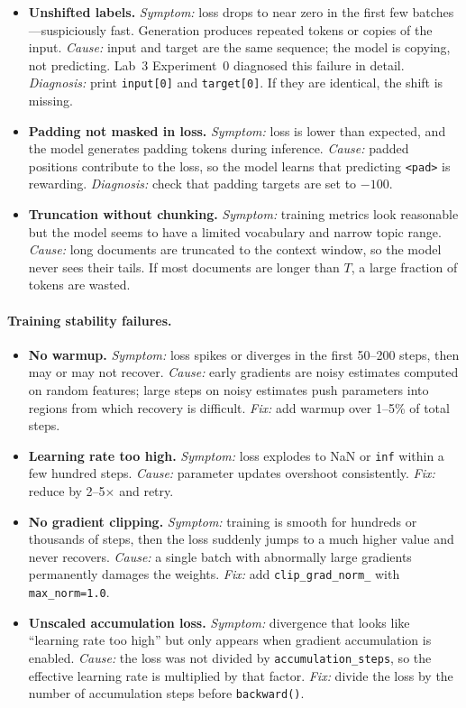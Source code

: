\begin{itemize}
  \item \textbf{Unshifted labels.} \emph{Symptom:} loss drops to near zero in the first few batches---suspiciously fast. Generation produces repeated tokens or copies of the input. \emph{Cause:} input and target are the same sequence; the model is copying, not predicting. Lab~3 Experiment~0 diagnosed this failure in detail. \emph{Diagnosis:} print \texttt{input[0]} and \texttt{target[0]}. If they are identical, the shift is missing.
  \item \textbf{Padding not masked in loss.} \emph{Symptom:} loss is lower than expected, and the model generates padding tokens during inference. \emph{Cause:} padded positions contribute to the loss, so the model learns that predicting \texttt{<pad>} is rewarding. \emph{Diagnosis:} check that padding targets are set to $-100$.
  \item \textbf{Truncation without chunking.} \emph{Symptom:} training metrics look reasonable but the model seems to have a limited vocabulary and narrow topic range. \emph{Cause:} long documents are truncated to the context window, so the model never sees their tails. If most documents are longer than $T$, a large fraction of tokens are wasted.
\end{itemize}

\paragraph{Training stability failures.}

\begin{itemize}
  \item \textbf{No warmup.} \emph{Symptom:} loss spikes or diverges in the first 50--200 steps, then may or may not recover. \emph{Cause:} early gradients are noisy estimates computed on random features; large steps on noisy estimates push parameters into regions from which recovery is difficult. \emph{Fix:} add warmup over 1--5\% of total steps.
  \item \textbf{Learning rate too high.} \emph{Symptom:} loss explodes to NaN or \texttt{inf} within a few hundred steps. \emph{Cause:} parameter updates overshoot consistently. \emph{Fix:} reduce by 2--5$\times$ and retry.
  \item \textbf{No gradient clipping.} \emph{Symptom:} training is smooth for hundreds or thousands of steps, then the loss suddenly jumps to a much higher value and never recovers. \emph{Cause:} a single batch with abnormally large gradients permanently damages the weights. \emph{Fix:} add \texttt{clip\_grad\_norm\_} with \texttt{max\_norm=1.0}.
  \item \textbf{Unscaled accumulation loss.} \emph{Symptom:} divergence that looks like ``learning rate too high'' but only appears when gradient accumulation is enabled. \emph{Cause:} the loss was not divided by \texttt{accumulation\_steps}, so the effective learning rate is multiplied by that factor. \emph{Fix:} divide the loss by the number of accumulation steps before \texttt{backward()}.
\end{itemize}

